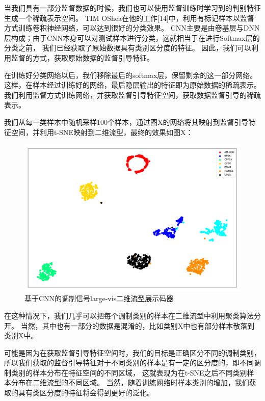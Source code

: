 当我们具有一部分监督数据的时候，我们也可以使用监督训练时学习到的判别特征生成一个稀疏表示空间。
TIM OShea在他的工作[14]中，利用有标记样本以监督方式训练卷积神经网络，可以达到很好的分类效果。
CNN主要是由卷基层与DNN层构成；由于CNN本身可以对测试样本进行分类，这就相当于在进行Softmax层的分类之前，
我们已经获取了原始数据具有类别区分度的特征。
因此，我们可以利用监督的方式，获取原始数据的监督引导特征。\par

在训练好分类网络以后，我们移除最后的softmax层，保留剩余的这一部分网络。
这样，在样本经过训练好的网络，最后隐层输出的特征即为原始数据的稀疏表示。
我们利用监督方式训练网络，并获取监督引导特征空间，获取数据监督引导的稀疏表示。\par
我们从每一类样本中随机采样100个样本，通过图X的网络将其映射到监督引导特征空间，并利用t-SNE映射到二维流型，最终的效果如图X：
\begin{figure}[!h]
	\centering
	\includegraphics[scale=0.4]{figures/chapter_3/fig_3_7}
	\caption{基于CNN的调制信号large-vis二维流型展示码器}	\label{sec:fig_3_7}
\end{figure}

在这种情况下，我们几乎可以把每个调制类别的样本在二维流型中利用聚类算法分开。
当然，其中也有一部分的数据是混淆的，比如类别X中也有部分样本散落到类别X中。\par
可能是因为在获取监督引导特征空间时，我们的目标是正确区分不同的调制类别，
所以我们获取的监督引导特征对于不同类别的样本是有一定的区分度的，即不同调制类别的样本分布在特征空间的不同区域，
这就表现为在t-SNE之后不同类别样本分布在二维流型的不同区域。
当然，随着训练网络时样本类别的增加，我们获取的具有类区分度的特征将会得到更好的泛化。\par


